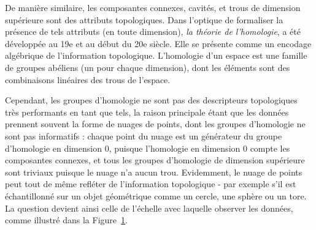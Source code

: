 \begin{figure}
\begin{minipage}{.3\textwidth}
  \captionof{figure}{
Ce nuage de points semble \'echantillonn\'e sur neuf cercle \`a petite \'echelle,
et sur un seul cercle \`a plus grande \'echelle.}
  \label{fig:echelle}
\end{minipage}
\end{figure}


De mani\`ere similaire, les composantes connexes, cavit\'es, et trous de dimension sup\'erieure sont des attributs topologiques.
Dans l'optique de formaliser la pr\'esence de tels attributs (en toute dimension), {\em la th\'eorie de l'homologie}, 
a \'et\'e d\'evelopp\'ee au 19e et au d\'ebut du 20e si\`ecle.
Elle se pr\'esente comme un encodage alg\'ebrique de l'information topologique.
L'homologie d'un espace est une famille de groupes ab\'eliens (un pour chaque dimension), dont les \'el\'ements sont des combinaisons
lin\'eaires des trous de l'espace.

Cependant, les groupes d'homologie ne %
sont pas des descripteurs topologiques tr\`es performants en tant que tels, la raison principale 
\'etant que les donn\'ees prennent souvent la forme de nuages de points, dont les groupes d'homologie ne sont pas informatifs : 
chaque point du nuage est un g\'en\'erateur du groupe d'homologie en dimension 0, puisque l'homologie en dimension 0 compte les
composantes connexes, et tous les groupes d'homologie de dimension sup\'erieure sont triviaux puisque le nuage n'a aucun trou.
Evidemment, le nuage de points peut tout de m\^eme refl\'eter de l'information topologique - par exemple s'il est \'echantillonn\'e 
sur un objet g\'eom\'etrique comme un cercle, une sph\`ere ou un tore. La question devient ainsi celle de l'\'echelle avec laquelle
observer les donn\'ees, comme illustr\'e dans la Figure~\ref{fig:echelle}. %



